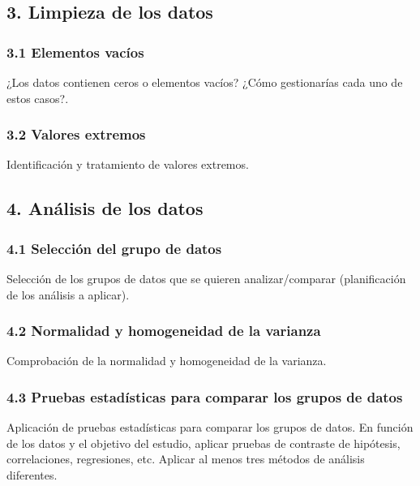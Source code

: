\documentclass[12pt]{article}
\begin{document}
\hypertarget{limpieza}{%
\subsection{3. Limpieza de los datos}\label{limpieza}} 

\hypertarget{ceros}{%
\subsubsection{3.1 Elementos vacíos}\label{ceros}}
¿Los datos contienen ceros o elementos vacíos? ¿Cómo gestionarías cada uno de estos casos?. 

\hypertarget{extremos}{%
\subsubsection{3.2 Valores extremos}\label{extremos}}
Identificación y tratamiento de valores extremos.
\hypertarget{analisis}{%
\subsection{4. Análisis de los datos}\label{analisis}}

\hypertarget{seleccion}{%
\subsubsection{4.1 Selección del grupo de datos}\label{seleccion}}
Selección de los grupos de datos que se quieren analizar/comparar (planificación de los análisis a aplicar). 
\hypertarget{normalidad}{%
\subsubsection{4.2  Normalidad y homogeneidad de la varianza}\label{normalidad}}
Comprobación de la normalidad y homogeneidad de la varianza. 

\hypertarget{estadistica}{%
\subsubsection{4.3  Pruebas estadísticas para comparar los grupos de datos}\label{estadistica}}
Aplicación de pruebas estadísticas para comparar los grupos de datos. En función de los datos y el objetivo del estudio, aplicar pruebas de contraste de hipótesis, correlaciones, regresiones, etc. Aplicar al menos tres métodos de análisis diferentes. 
\end{document}
